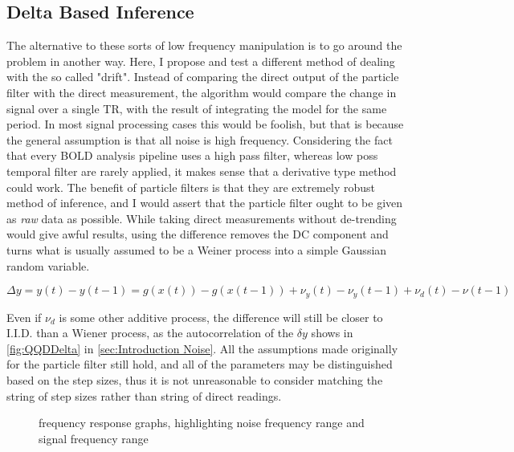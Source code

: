 \subsection{Delta Based Inference}
\label{sec:Methods Delta Based Inference}
The alternative to these sorts of low frequency manipulation is to
go around the problem in another way. Here, I propose and test a 
different method of dealing with the so called "drift". 
Instead of comparing the direct output of the particle filter with the direct
measurement, the algorithm would compare the change in signal over a single TR,
with the result of integrating the model for the same period. 
In most signal processing cases this would be foolish, but that is because the 
general assumption is that all noise is high frequency. Considering 
the fact that every BOLD analysis pipeline uses a high pass filter,
whereas low poss temporal filter are rarely applied, it makes sense
that a derivative type method could work. The benefit of particle filters
is that they are extremely robust method of inference, and I would assert 
that the particle filter ought to be given as \emph{raw} data as possible. 
While taking direct measurements
without de-trending would give awful results, using the difference removes the 
DC component and turns what is usually assumed to be a Weiner process into 
a simple Gaussian random variable. 

\begin{equation}
\Delta y = y(t) - y(t-1) = g(x(t)) - g(x(t-1)) + \nu_y(t) - \nu_y(t-1) + \nu_d(t) - \nu(t-1)
\label{eq:measass_delta}
\end{equation}

Even if $\nu_d$ is some other additive process, the difference will still be closer
to I.I.D. than a Wiener process, as the autocorrelation of the $\delta y$ shows
in \autoref{fig:QQDDelta} in \autoref{sec:Introduction Noise}. 
 All the assumptions made originally
for the particle filter still hold, and all of the parameters may be distinguished based on
the step sizes, thus it is not unreasonable to consider matching the string of step sizes
rather than string of direct readings. 

\begin{figure}
\label{fig:FrequencyGraphs}
\caption{frequency response graphs, highlighting noise frequency range and signal frequency range}
\end{figure}


